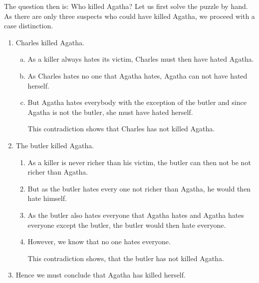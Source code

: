 


\noindent
The question then is: Who killed Agatha?  Let us first solve the puzzle by hand.  As there are only three
suspects who could have killed Agatha, we proceed with a case distinction.
\begin{enumerate}
\item Charles killed Agatha.
  \begin{enumerate}[(a)]
  \item As a killer always hates its victim, Charles must then have hated Agatha.
  \item As Charles hates no one that Agatha hates, Agatha can not have hated herself.
  \item But Agatha hates everybody with the exception of the butler and since Agatha is not the
        butler, she must have hated herself.

        This contradiction shows that Charles has not killed Agatha.
  \end{enumerate}
\item The butler killed Agatha.
  \begin{enumerate}
  \item As a killer is never richer than his victim, the butler can then not be not richer than Agatha.
  \item But as the butler hates every one not richer than Agatha, he would then hate himself.
  \item As the butler also hates everyone that Agatha hates and Agatha hates everyone except the butler,
        the butler would then hate everyone.
  \item However, we know that no one hates everyone.

        This contradiction shows, that the butler has not killed Agatha.      
  \end{enumerate}
\item Hence we must conclude that Agatha has killed herself.
\end{enumerate}
